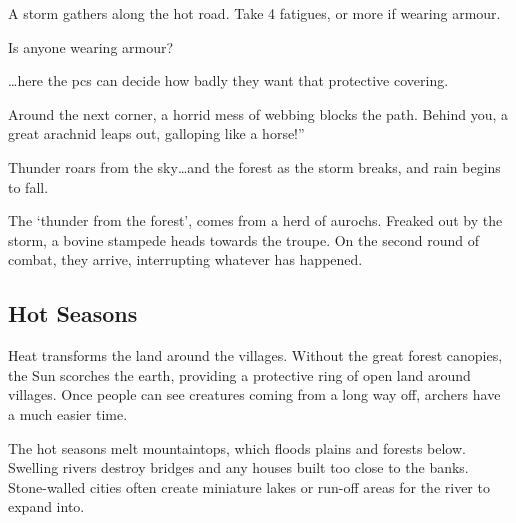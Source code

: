 \begin{multicols}{2}
\begin{exampletext}
  \begin{speechtext}
    A storm gathers along the hot road.
    Take 4 \glspl{fatigue}, or more if wearing armour.

    Is anyone wearing armour?
  \end{speechtext}

  \ldots here the \glspl{pc} can decide how badly they want that protective covering.

  \begin{speechtext}
    Around the next corner, a horrid mess of webbing blocks the path.
    Behind you, a great arachnid leaps out, galloping like a horse!''

    Thunder roars from the sky\ldots and the forest as the storm breaks, and rain begins to fall.
  \end{speechtext}

  The `thunder from the forest', comes from a herd of aurochs.
  Freaked out by the storm, a bovine stampede heads towards the troupe.
  On the second round of combat, they arrive, interrupting whatever has happened.

\end{exampletext}

\end{multicols}

\vfill\null
\bigLine

\noindent
\begin{minipage}{\linewidth}
\begin{multicols}{2}

\subsection{Hot Seasons}

\noindent
Heat transforms the land around the villages.
Without the great forest canopies, the Sun scorches the earth, providing a protective ring of open land around villages.
Once people can see creatures coming from a long way off, archers have a much easier time.

The hot seasons melt mountaintops, which floods plains and forests below.
Swelling rivers destroy bridges and any houses built too close to the banks.
Stone-walled cities often create miniature lakes or run-off areas for the river to expand into.

\setcounter{enc}{0}
\setcounter{track}{0}

\encWarmVillages

\encWarmEdge

\encWarmForest

\end{multicols}
\end{minipage}

